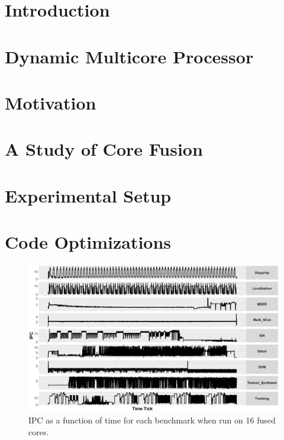 \newcommand{\bm}[1]{\textit{#1}}
\setlength{\textfloatsep}{0.1cm}



\section{Introduction}\label{sect:introduction}


\section{Dynamic Multicore Processor}\label{sect:background}


\vspace{-2mm}
\section{Motivation}\label{sec:motivation}


\section{A Study of Core Fusion}\label{sec:lim_study}


\section{Experimental Setup}\label{sec:setup}


\section{Code Optimizations}\label{sec:opt}


\begin{figure}[t]
    \centering
    \includegraphics[width=1\textwidth]{cases-paper/graphics/Exploration/ipcs_16_2.pdf}
    \vspace*{-8mm}
    \caption{IPC as a function of time for each benchmark when run on 16 fused cores.}
    \label{fig:sxt}
\vspace{5mm}
\end{figure}

